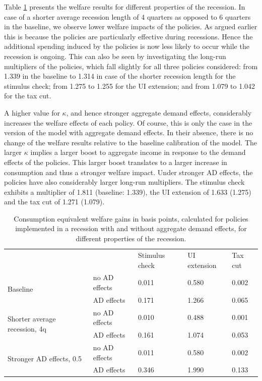 \documentclass[../HAFiscal]{subfiles}
\begin{document}
Table \ref{tab:robustness_recession_property_results} presents the welfare results for different properties of the recession. In case of a shorter average recession length of 4 quarters as opposed to 6 quarters in the baseline, we observe lower welfare impacts of the policies. As argued earlier this is because the policies are particularly effective during recessions. Hence the additional spending induced by the policies is now less likely to occur while the recession is ongoing. This can also be seen by investigating the long-run multipliers of the policies, which fall slightly for all three policies considered: from 1.339 in the baseline to 1.314 in case of the shorter recession length for the stimulus check; from 1.275 to 1.255 for the UI extension; and from 1.079 to 1.042 for the tax cut.

A higher value for $\kappa$, and hence stronger aggregate demand effects, considerably increases the welfare effects of each policy. Of course, this is only the case in the version of the model with aggregate demand effects. In their absence, there is no change of the welfare results relative to the baseline calibration of the model. The larger $\kappa$ implies a larger boost to aggregate income in response to the demand effects of the policies. This larger boost translates to a larger increase in consumption and thus a stronger welfare impact. Under stronger AD effects, the policies have also considerably larger long-run multipliers. The stimulus check exhibits a multiplier of 1.811 (baseline: 1.339), the UI extension of 1.633 (1.275) and the tax cut of 1.271 (1.079).


\begin{table}[]
	\begin{center}
		\begin{tabular}{@{}lllll@{}}
			\toprule
			&                    											& Stimulus check & UI extension & Tax cut 	\\ \cmidrule(l){1-5}
			\multirow{2}{*}{Baseline} 						& no AD effects & 0.011          & 0.580        & 0.002   	\\
			& AD effects    & 0.171          & 1.266        & 0.065   	\\ 
			\multirow{2}{*}{Shorter average recession, 4q}  & no AD effects & 0.010          & 0.488        & 0.001  	\\
			& AD effects    & 0.161          & 1.074        & 0.053   	\\
			\multirow{2}{*}{Stronger AD effects, 0.5}       & no AD effects & 0.011          & 0.580        & 0.002   	\\
			& AD effects    & 0.346          & 1.990        & 0.133   	\\ \cmidrule(l){1-5} 
		\end{tabular}
		\caption{Consumption equivalent welfare gains in basis points, calculated for policies implemented in a recession with and without aggregate demand effects, for different properties of the recession.}
		\label{tab:robustness_recession_property_results}
	\end{center}
\end{table}
\end{document}

